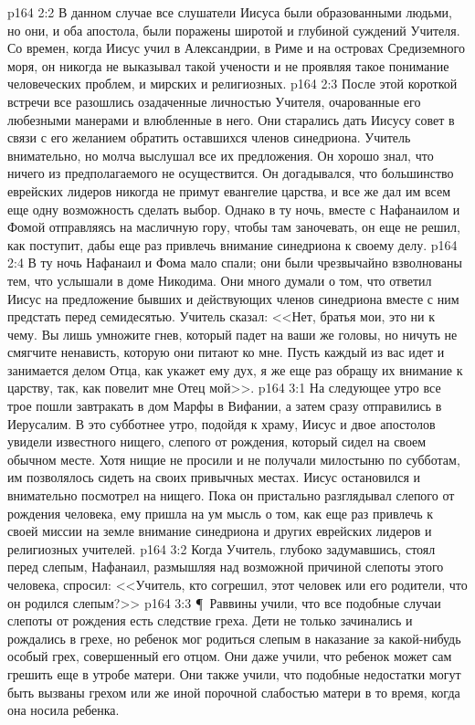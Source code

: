 \vs p164 2:2 В данном случае все слушатели Иисуса были образованными людьми, но они, и оба апостола, были поражены широтой и глубиной суждений Учителя. Со времен, когда Иисус учил в Александрии, в Риме и на островах Средиземного моря, он никогда не выказывал такой учености и не проявляя такое понимание человеческих проблем, и мирских и религиозных.
\vs p164 2:3 После этой короткой встречи все разошлись озадаченные личностью Учителя, очарованные его любезными манерами и влюбленные в него. Они старались дать Иисусу совет в связи с его желанием обратить оставшихся членов синедриона. Учитель внимательно, но молча выслушал все их предложения. Он хорошо знал, что ничего из предполагаемого не осуществится. Он догадывался, что большинство еврейских лидеров никогда не примут евангелие царства, и все же дал им всем еще одну возможность сделать выбор. Однако в ту ночь, вместе с Нафанаилом и Фомой отправляясь на масличную гору, чтобы там заночевать, он еще не решил, как поступит, дабы еще раз привлечь внимание синедриона к своему делу.
\vs p164 2:4 В ту ночь Нафанаил и Фома мало спали; они были чрезвычайно взволнованы тем, что услышали в доме Никодима. Они много думали о том, что ответил Иисус на предложение бывших и действующих членов синедриона вместе с ним предстать перед семидесятью. Учитель сказал: <<Нет, братья мои, это ни к чему. Вы лишь умножите гнев, который падет на ваши же головы, но ничуть не смягчите ненависть, которую они питают ко мне. Пусть каждый из вас идет и занимается делом Отца, как укажет ему дух, я же еще раз обращу их внимание к царству, так, как повелит мне Отец мой>>.
\vs p164 3:1 На следующее утро все трое пошли завтракать в дом Марфы в Вифании, а затем сразу отправились в Иерусалим. В это субботнее утро, подойдя к храму, Иисус и двое апостолов увидели известного нищего, слепого от рождения, который сидел на своем обычном месте. Хотя нищие не просили и не получали милостыню по субботам, им позволялось сидеть на своих привычных местах. Иисус остановился и внимательно посмотрел на нищего. Пока он пристально разглядывал слепого от рождения человека, ему пришла на ум мысль о том, как еще раз привлечь к своей миссии на земле внимание синедриона и других еврейских лидеров и религиозных учителей.
\vs p164 3:2 Когда Учитель, глубоко задумавшись, стоял перед слепым, Нафанаил, размышляя над возможной причиной слепоты этого человека, спросил: <<Учитель, кто согрешил, этот человек или его родители, что он родился слепым?>>
\vs p164 3:3 \P\ Раввины учили, что все подобные случаи слепоты от рождения есть следствие греха. Дети не только зачинались и рождались в грехе, но ребенок мог родиться слепым в наказание за какой\hyp{}нибудь особый грех, совершенный его отцом. Они даже учили, что ребенок может сам грешить еще в утробе матери. Они также учили, что подобные недостатки могут быть вызваны грехом или же иной порочной слабостью матери в то время, когда она носила ребенка.
